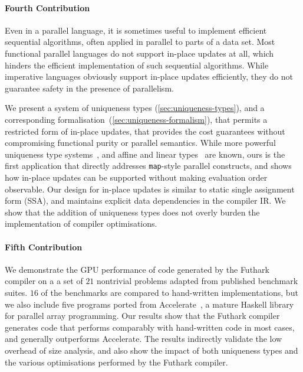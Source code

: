 \paragraph{Fourth Contribution}

Even in a parallel language, it is sometimes useful to implement
efficient sequential algorithms, often applied in parallel to parts of
a data set.  Most functional parallel languages do not support
in-place updates at all, which hinders the efficient implementation of
such sequential algorithms.  While imperative languages obviously
support in-place updates efficiently, they do not guarantee safety in
the presence of parallelism.

We present a system of uniqueness types (\cref{sec:uniqueness-types}),
and a corresponding formalisation~(\cref{sec:uniqueness-formalism}),
that permits a restricted form of in-place updates, that provides the
cost guarantees without compromising functional purity or parallel
semantics.  While more powerful uniqueness type
systems~\cite{clean-uniqueness-types}, and affine and linear
types~\cite{Tov:2011:PAT:1926385.1926436,Fahndrich:2002:AFP:543552.512532}
are known, ours is the first application that directly addresses
\texttt{map}-style parallel constructs, and shows how in-place updates
can be supported without making evaluation order observable.  Our
design for in-place updates is similar to static single assignment
form (SSA), and maintains explicit data dependencies in the compiler
IR.  We show that the addition of uniqueness types does not overly
burden the implementation of compiler optimisations.

\paragraph{Fifth Contribution}

We demonstrate the GPU performance of code generated by the Futhark
compiler on a a set of $21$ nontrivial problems adapted from published
benchmark suites.  $16$ of the benchmarks are compared to hand-written
implementations, but we also include five programs ported from
Accelerate~\cite{mcdonell2013optimising}, a mature Haskell library for
parallel array programming. Our results show that the Futhark compiler
generates code that performs comparably with hand-written code in most
cases, and generally outperforms Accelerate.  The results indirectly
validate the low overhead of size analysis, and also show the impact
of both uniqueness types and the various optimisations performed by
the Futhark compiler.

